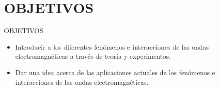 \section{OBJETIVOS}
\begin{frame}{OBJETIVOS}
    \Large{\begin{itemize}
        \item Introducir a los diferentes fenómenos e interacciones de las ondas electromagnéticas a través de teoría y experimentos.
        \item Dar una idea acerca de las aplicaciones actuales de los fenómenos e interacciones de las ondas electromagnéticas.
    \end{itemize}}
\end{frame}
